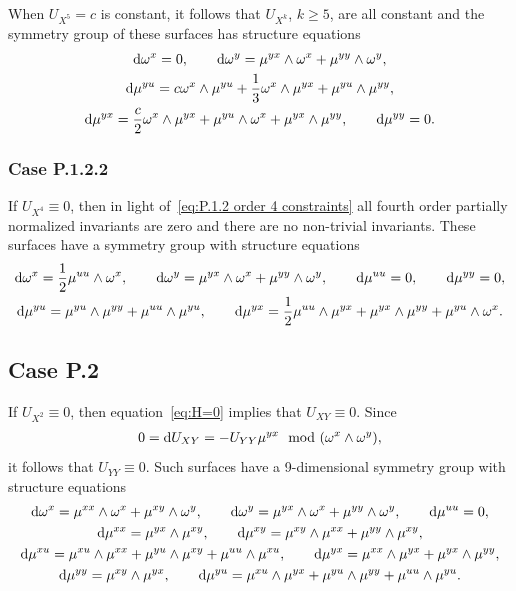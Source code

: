 \documentclass[10pt,a4paper]{amsart}
\numberwithin{equation}{section}
\begin{document}
When $U_{X^5}=c$ is constant, it follows that $U_{X^k}$, $k\geq 5$, are all constant and the symmetry group of these surfaces has structure equations
\begin{gather*}
{\rm d}\omega^x=0,\qquad
{\rm d}\omega^y=\mu^{yx}\wedge \omega^x +\mu^{yy}\wedge \omega^y,
\\
{\rm d}\mu^{yu} = c \omega^x\wedge \mu^{yu}+\frac{1}{3}\omega^x\wedge \mu^{yx}+\mu^{yu}\wedge \mu^{yy},\\
{\rm d}\mu^{yx} = \frac{c}{2} \omega^x\wedge \mu^{yx}+\mu^{yu}\wedge \omega^x+\mu^{yx}\wedge \mu^{yy},\qquad
 {\rm d}\mu^{yy}= 0.
\end{gather*}

\subsubsection{Case P.1.2.2}

If $U_{X^4}\equiv 0$, then in light of~\eqref{eq:P.1.2 order 4 constraints} all fourth order partially normalized invariants are zero and there are no non-trivial invariants. These surfaces have a symmetry group with structure equations
%
\begin{gather*}
{\rm d}\omega^x=\frac{1}{2}\mu^{uu}\wedge\omega^x,\qquad
{\rm d}\omega^y = \mu^{yx} \wedge \omega^x+\mu^{yy}\wedge \omega^y,\qquad {\rm d}\mu^{uu}=0,\qquad {\rm d}\mu^{yy}=0,\\
{\rm d}\mu^{yu}=\mu^{yu}\wedge \mu^{yy}+\mu^{uu}\wedge \mu^{yu},\qquad
{\rm d}\mu^{yx}=\frac{1}{2}\mu^{uu}\wedge \mu^{yx}+\mu^{yx}\wedge \mu^{yy}+\mu^{yu}\wedge \omega^x.
\end{gather*}

\subsection{Case P.2}

If $U_{X^2} \equiv 0$, then equation~\eqref{eq:H=0} implies that $U_{XY} \equiv 0$. Since
\begin{gather*}
0={\rm d}U_{XY}=-U_{YY}\mu^{yx} \mod(\omega^x\wedge \omega^y),
\end{gather*}
it follows that $U_{YY}\equiv 0$. Such surfaces have a 9-dimensional symmetry group with structure equations
%
\begin{gather*}
{\rm d}\omega^x=\mu^{xx}\wedge \omega^x+\mu^{xy}\wedge \omega^y,\qquad
{\rm d}\omega^y = \mu^{yx}\wedge \omega^x + \mu^{yy}\wedge \omega^y,\qquad {\rm d}\mu^{uu}=0,\\
{\rm d}\mu^{xx} = \mu^{yx}\wedge \mu^{xy},\qquad
{\rm d}\mu^{xy} = \mu^{xy}\wedge \mu^{xx}+\mu^{yy}\wedge \mu^{xy},\\
{\rm d}\mu^{xu}=\mu^{xu}\wedge \mu^{xx} + \mu^{yu}\wedge \mu^{xy}+\mu^{uu}\wedge \mu^{xu},\qquad
{\rm d}\mu^{yx}=\mu^{xx}\wedge \mu^{yx}+\mu^{yx}\wedge \mu^{yy},\\
{\rm d}\mu^{yy}=\mu^{xy}\wedge \mu^{yx},\qquad
{\rm d}\mu^{yu} = \mu^{xu}\wedge\mu^{yx}+\mu^{yu}\wedge \mu^{yy}+\mu^{uu}\wedge\mu^{yu}.
\end{gather*}
\end{document}
